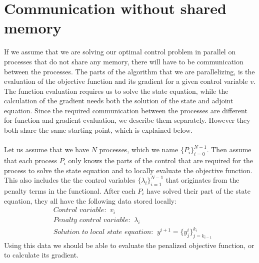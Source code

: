 \section{Communication without shared memory}
If we assume that we are solving our optimal control problem in parallel on processes that do not share any memory, there will have to be communication between the processes. The parts of the algorithm that we are parallelizing, is the evaluation of the objective function and its gradient for a given control variable $v$. The function evaluation requires us to solve the state equation, while the calculation of the gradient needs both the solution of the state and adjoint equation. Since the required communication between the processes are different for function and gradient evaluation, we describe them separately. However they both share the same starting point, which is explained below.
\\
\\
Let us assume that we have $N$ processes, which we name $\{P_{i}\}_{i=0}^{N-1}$. Then assume that each process $P_i$ only knows the parts of the control that are required for the process to solve the state equation and to locally evaluate the objective function. This also includes the the control variables $\{\lambda_i\}_{i=1}^{N-1}$ that originates from the penalty terms in the functional. After each $P_i$ have solved their part of the state equation, they all have the following data stored locally:
\begin{align*}
&\textit{Control variable: } \ v_i \\
&\textit{Penalty control variable: } \ \lambda_i \\
&\textit{Solution to local state equation: } \ y^{i+1} =\{y_j^i\}_{j=k_{i-1}}^{ k_{i}}
\end{align*}
Using this data we should be able to evaluate the penalized objective function, or to calculate its gradient.
